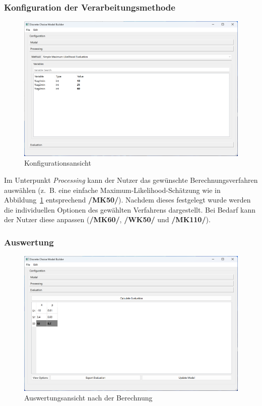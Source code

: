 \documentclass{article}
\begin{document}
\subsubsection{Konfiguration der Verarbeitungsmethode}
\begin{figure}[H]%
  \centering
  \includegraphics[width=12cm]{specifications/img/gui-screenshots/processing.png}
  \caption{Konfigurationsansicht}
  \label{gui:fig_processing}
\end{figure}
Im Unterpunkt \emph{Processing} kann der Nutzer das gewünschte Berechnungsverfahren auswählen (z.~B. eine einfache Maximum-Likelihood-Schätzung wie in Abbildung~\ref{gui:fig_processing} entsprechend \textbf{/MK50/}). Nachdem dieses festgelegt wurde werden die individuellen Optionen des gewählten Verfahrens dargestellt. Bei Bedarf kann der Nutzer diese anpassen (\textbf{/MK60/}, \textbf{/WK50/} und \textbf{/MK110/}).\\

\subsubsection{Auswertung}
\begin{figure}[H]%
  \centering
  \includegraphics[width=12cm]{specifications/img/gui-screenshots/evaluation.png}
  \caption{Auswertungsansicht nach der Berechnung}
  \label{gui:fig_evaluation}
\end{figure}
\end{document}
